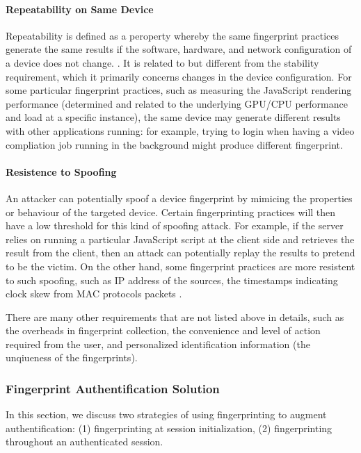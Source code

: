 \documentclass{acm_proc_article-sp}
\begin{document}
\paragraph{ Repeatability on Same Device }
Repeatability is defined as a peroperty whereby the same fingerprint practices generate the same results if the software, hardware, and network configuration of a device does not change. \cite{alca:dev}. It is related to but different from the stability requirement, which it primarily concerns changes in the device configuration.
For some particular fingerprint practices, such as measuring the JavaScript rendering performance (determined and related to the underlying GPU/CPU performance and load at a specific instance), the same device may generate different results with other applications running: for example, trying to login when having a video compliation job running in the background might produce different fingerprint.

\paragraph { Resistence to Spoofing}
An attacker can potentially spoof a device fingerprint by mimicing the properties or behaviour of the targeted device. Certain fingerprinting practices will then have a low threshold for this kind of spoofing attack. For example, if the server relies on running a particular JavaScript script at the client side and retrieves the result from the client, then an attack can potentially replay the results to pretend to be the victim.
On the other hand, some fingerprint practices are more resistent to such spoofing, such as IP address of the sources\cite{beverly:ip}, the timestamps indicating clock skew from MAC protocols packets \cite{ara:wire}.

There are many other requirements that are not listed above in details, such as the overheads in fingerprint collection, the convenience and level of action required from the user, and personalized identification information (the unqiueness of the fingerprints).


\subsubsection{Fingerprint Authentification Solution}
In this section, we discuss two strategies of using fingerprinting to augment authentification: (1) fingerprinting at session initialization, (2) fingerprinting throughout an authenticated session. 
\end{document}
